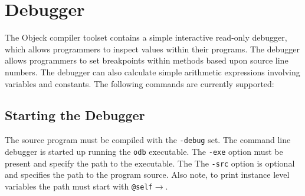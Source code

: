 \documentclass[11pt]{article}
\begin{document}
\section{Debugger}
The Objeck compiler toolset contains a simple interactive read-only
debugger, which allows programmers to inspect values within their
programs.  The debugger allows programmers to set breakpoints within
methods based upon source line numbers.  The debugger can also
calculate simple arithmetic expressions involving variables and
constants. The following commands are currently supported:

\subsection{Starting the Debugger}
The source program must be compiled with the \texttt{-debug} set. The
command line debugger is started up running the \texttt{odb}
executable. The \texttt{-exe} option must be present and specify the
path to the executable.  The The \texttt{-src} option is optional and
specifies the path to the program source.  Also note, to print
instance level variables the path must start with
\texttt{@self$\rightarrow$}.
\end{document}
